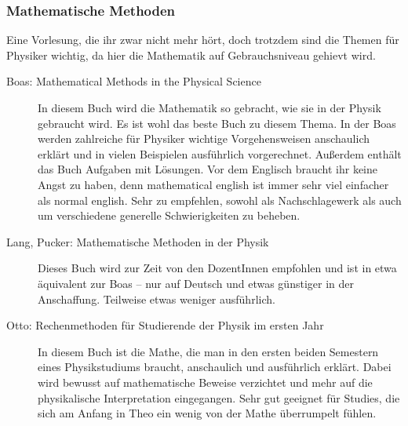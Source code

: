 \subsubsection{Mathematische Methoden}

Eine Vorlesung, die ihr zwar nicht mehr hört, doch trotzdem sind die
Themen für
Physiker wichtig, da hier die Mathematik auf Gebrauchsniveau gehievt
wird.

\begin{description}

\item[Boas: Mathematical Methods in the Physical Science]{
In diesem Buch wird die Mathematik so gebracht, wie sie in der Physik
gebraucht
wird. Es ist wohl das beste Buch zu diesem Thema. In der Boas werden
zahlreiche
für Physiker wichtige Vorgehensweisen anschaulich erklärt und in
vielen
Beispielen ausführlich vorgerechnet. Außerdem enthält das
Buch Aufgaben mit Lösungen. Vor dem Englisch braucht ihr keine Angst zu
haben, denn mathematical english ist immer sehr viel einfacher als
normal
english. Sehr zu empfehlen, sowohl als Nachschlagewerk als auch um
verschiedene
generelle Schwierigkeiten zu beheben.}

\item[Lang, Pucker: Mathematische Methoden in der Physik]{
Dieses Buch wird zur Zeit von den DozentInnen empfohlen und ist in etwa
äquivalent zur Boas -- nur auf Deutsch und etwas günstiger in der
Anschaffung.
Teilweise etwas weniger ausführlich.}



\item[Otto: Rechenmethoden für Studierende der Physik im ersten Jahr]{
In diesem Buch ist die Mathe, die man in den ersten beiden Semestern eines Physikstudiums braucht, anschaulich und ausführlich erklärt. Dabei wird bewusst auf mathematische Beweise verzichtet und mehr auf die physikalische Interpretation eingegangen. Sehr gut geeignet für Studies, die sich am Anfang in Theo ein wenig von der Mathe überrumpelt fühlen.}
\end{description}

